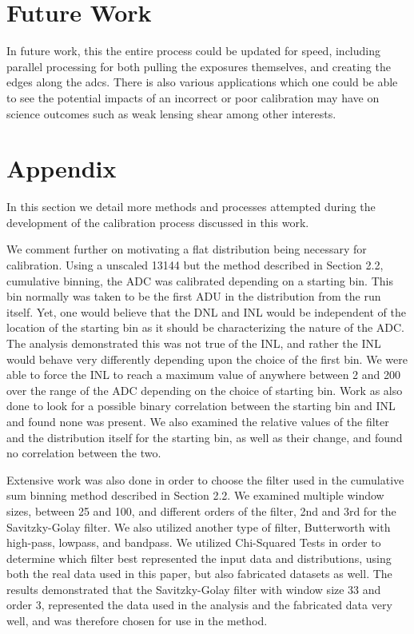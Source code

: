 \documentclass[11pt, letterpaper]{article}
\begin{document}
\section{Future Work}
\indent


In future work, this the entire process could be updated for speed, including parallel processing for both pulling the exposures themselves, and creating the edges along the adcs. 
There is also various applications which one could be able to see the potential impacts of an incorrect or poor calibration may have on science outcomes such as weak lensing shear among other interests. 

\section{Appendix}
\indent

In this section we detail more methods and processes attempted during the development of the calibration process discussed in this work. 
\indent


We comment further on motivating a flat distribution being necessary for calibration.
Using a unscaled 13144 but the method described in Section 2.2, cumulative binning, the ADC was calibrated depending on a starting bin.
This bin normally was taken to be the first ADU in the distribution from the run itself. 
Yet, one would believe that the DNL and INL would be independent of the location of the starting bin as it should be characterizing the nature of the ADC.
The analysis demonstrated this was not true of the INL, and rather the INL would behave very differently depending upon the choice of the first bin. 
We were able to force the INL to reach a maximum value of anywhere between 2 and 200 over the range of the ADC depending on the choice of starting bin.
Work as also done to look for a possible binary correlation between the starting bin and INL and found none was present. 
We also examined the relative values of the filter and the distribution itself for the starting bin, as well as their change, and found no correlation between the two. 
 \indent 
 
 
Extensive work was also done in order to choose the filter used in the cumulative sum binning method described in Section 2.2. 
We examined multiple window sizes, between 25 and 100, and different orders of the filter, 2nd and 3rd for the Savitzky-Golay filter. 
We also utilized another type of filter, Butterworth with high-pass, lowpass, and bandpass. 
We utilized Chi-Squared Tests in order to determine which filter best represented the input data and distributions, using both the real data used in this paper, but also fabricated datasets as well. 
The results demonstrated that the Savitzky-Golay filter with window size 33 and order 3, represented the data used in the analysis and the fabricated data very well, and was therefore chosen for use in the method. 
 \indent 
\end{document}
